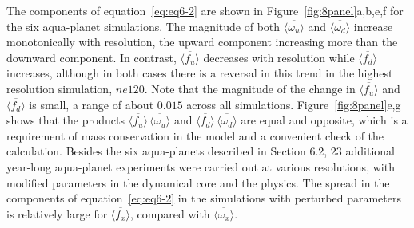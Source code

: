 The components of equation~\ref{eq:eq6-2} are shown in Figure~\ref{fig:8panel}a,b,e,f for the six aqua-planet simulations. The magnitude of both $\overline{\langle \omega_{u} \rangle}$ and $\overline{\langle \omega_{d} \rangle}$ increase monotonically with resolution, the upward component increasing more than the downward component. In contrast, $\overline{\langle f_{u} \rangle}$ decreases with resolution while $\overline{\langle f_{d} \rangle}$ increases, although in both cases there is a reversal in this trend in the highest resolution simulation, $ne120$. Note that the magnitude of the change in $\overline{\langle f_{u} \rangle}$ and $\overline{\langle f_{d} \rangle}$ is small, a range of about $0.015$ across all simulations. Figure~\ref{fig:8panel}e,g shows that the products  $\overline{\langle f_{u} \rangle} \, \overline{\langle \omega_{u} \rangle}$ and $\overline{\langle f_{d} \rangle} \, \overline{\langle \omega_{d} \rangle}$ are equal and opposite, which is a requirement of mass conservation in the model and a convenient check of the calculation. Besides the six aqua-planets described in Section 6.2, 23 additional year-long aqua-planet experiments were carried out at various resolutions, with modified parameters in the dynamical core and the physics. The spread in the components of equation~\ref{eq:eq6-2} in the simulations with perturbed parameters is relatively large for $\overline{\langle f_{x} \rangle}$, compared with $\overline{\langle \omega_{x} \rangle}$.

